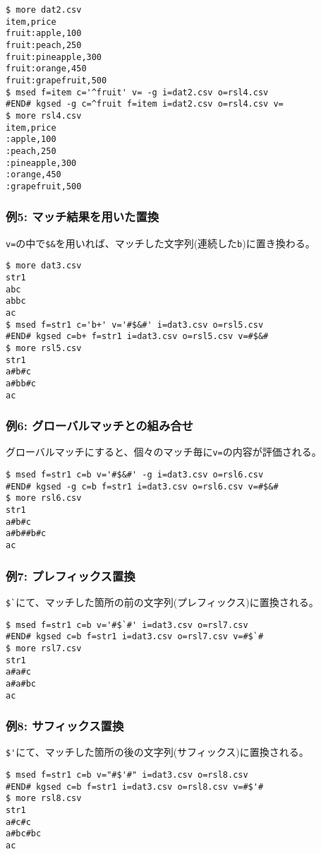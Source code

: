 \begin{Verbatim}[baselinestretch=0.7,frame=single]
$ more dat2.csv
item,price
fruit:apple,100
fruit:peach,250
fruit:pineapple,300
fruit:orange,450
fruit:grapefruit,500
$ msed f=item c='^fruit' v= -g i=dat2.csv o=rsl4.csv
#END# kgsed -g c=^fruit f=item i=dat2.csv o=rsl4.csv v=
$ more rsl4.csv
item,price
:apple,100
:peach,250
:pineapple,300
:orange,450
:grapefruit,500
\end{Verbatim}
\subsubsection*{例5: マッチ結果を用いた置換}

\verb|v=|の中で\verb|$&|を用いれば、マッチした文字列(連続した\verb|b|)に置き換わる。


\begin{Verbatim}[baselinestretch=0.7,frame=single]
$ more dat3.csv
str1
abc
abbc
ac
$ msed f=str1 c='b+' v='#$&#' i=dat3.csv o=rsl5.csv
#END# kgsed c=b+ f=str1 i=dat3.csv o=rsl5.csv v=#$&#
$ more rsl5.csv
str1
a#b#c
a#bb#c
ac
\end{Verbatim}
\subsubsection*{例6: グローバルマッチとの組み合せ}

グローバルマッチにすると、個々のマッチ毎に\verb|v=|の内容が評価される。


\begin{Verbatim}[baselinestretch=0.7,frame=single]
$ msed f=str1 c=b v='#$&#' -g i=dat3.csv o=rsl6.csv
#END# kgsed -g c=b f=str1 i=dat3.csv o=rsl6.csv v=#$&#
$ more rsl6.csv
str1
a#b#c
a#b##b#c
ac
\end{Verbatim}
\subsubsection*{例7: プレフィックス置換}

\verb|$`|にて、マッチした箇所の前の文字列(プレフィックス)に置換される。


\begin{Verbatim}[baselinestretch=0.7,frame=single]
$ msed f=str1 c=b v='#$`#' i=dat3.csv o=rsl7.csv
#END# kgsed c=b f=str1 i=dat3.csv o=rsl7.csv v=#$`#
$ more rsl7.csv
str1
a#a#c
a#a#bc
ac
\end{Verbatim}
\subsubsection*{例8: サフィックス置換}

\verb|$'|にて、マッチした箇所の後の文字列(サフィックス)に置換される。


\begin{Verbatim}[baselinestretch=0.7,frame=single]
$ msed f=str1 c=b v="#$'#" i=dat3.csv o=rsl8.csv
#END# kgsed c=b f=str1 i=dat3.csv o=rsl8.csv v=#$'#
$ more rsl8.csv
str1
a#c#c
a#bc#bc
ac
\end{Verbatim}
